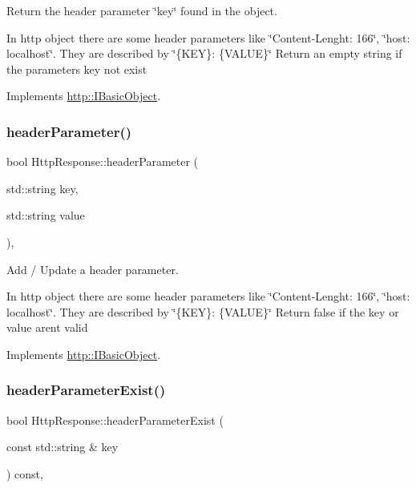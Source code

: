 Return the header parameter \char`\"{}key\char`\"{} found in the object. 

In http object there are some header parameters like \char`\"{}\+Content-\/\+Lenght\+: 166\char`\"{}, \char`\"{}host\+: localhost\char`\"{}. They are described by \char`\"{}\{\+K\+E\+Y\}\+: \{\+V\+A\+L\+U\+E\}\char`\"{} Return an empty string if the parameters key not exist 

Implements \hyperlink{structhttp_1_1IBasicObject_a17f97dd4917fdd7dd694d3d191eaebca}{http\+::\+I\+Basic\+Object}.

\mbox{\label{classHttpResponse_a193cf7b72bfedfc7f37318aff1d55158}} 
\subsubsection{\texorpdfstring{header\+Parameter()}{headerParameter()}\hspace{0.1cm}{\footnotesize\ttfamily [2/2]}}
{\footnotesize\ttfamily bool Http\+Response\+::header\+Parameter (\begin{DoxyParamCaption}\item[{std\+::string}]{key,  }\item[{std\+::string}]{value }\end{DoxyParamCaption})\hspace{0.3cm}{\ttfamily [virtual]}, {\ttfamily [noexcept]}}



Add / Update a header parameter. 

In http object there are some header parameters like \char`\"{}\+Content-\/\+Lenght\+: 166\char`\"{}, \char`\"{}host\+: localhost\char`\"{}. They are described by \char`\"{}\{\+K\+E\+Y\}\+: \{\+V\+A\+L\+U\+E\}\char`\"{} Return false if the key or value aren\textquotesingle{}t valid 

Implements \hyperlink{structhttp_1_1IBasicObject_a0d1fff270c6069bedf87e86cdac6bf3d}{http\+::\+I\+Basic\+Object}.

\mbox{\label{classHttpResponse_ae119bd9c54b39e392b2fd87c3012f53e}} 
\subsubsection{\texorpdfstring{header\+Parameter\+Exist()}{headerParameterExist()}}
{\footnotesize\ttfamily bool Http\+Response\+::header\+Parameter\+Exist (\begin{DoxyParamCaption}\item[{const std\+::string \&}]{key }\end{DoxyParamCaption}) const\hspace{0.3cm}{\ttfamily [virtual]}, {\ttfamily [noexcept]}}



